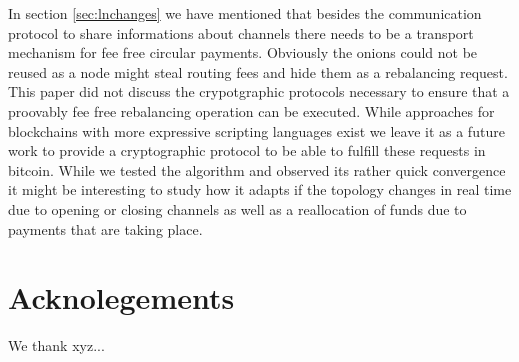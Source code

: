 \documentclass[a4paper]{paper}
\begin{document}
In section \ref{sec:lnchanges} we have mentioned that besides the communication protocol to share informations about channels there needs to be a transport mechanism for fee free circular payments.
Obviously the onions could not be reused as a node might steal routing fees and hide them as a rebalancing request.
This paper did not discuss the crypotgraphic protocols necessary to ensure that a proovably fee free rebalancing operation can be executed.
While approaches for blockchains with more expressive scripting languages exist \cite{khalil2017revive} we leave it as a future work to provide a cryptographic protocol to be able to fulfill these requests in bitcoin.
While we tested the algorithm and observed its rather quick convergence it might be interesting to study how it adapts if the topology changes in real time due to opening or closing channels as well as a reallocation of funds due to payments that are taking place.

\section{Acknolegements}\label{sec:ack}
We thank xyz...




\end{document}
